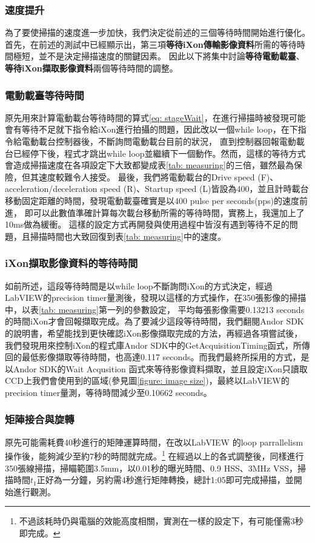\documentclass[12pt]{article}
\begin{document}
\subsubsection{速度提升}
為了要使掃描的速度進一步加快，我們決定從前述的三個等待時間開始進行優化。首先，在前述的測試中已經顯示出，第三項\textbf{等待iXon傳輸影像資料}所需的等待時間極短，並不是決定掃描速度的關鍵因素。
因此以下將集中討論\textbf{等待電動載臺}、\textbf{等待iXon擷取影像資料}兩個等待時間的調整。
\subsubsection{電動載臺等待時間}
原先用來計算電動載台等待時間的算式\ref{eq: stageWait}，在進行掃描時被發現可能會有等待不足就下指令給iXon進行拍攝的問題，因此改以一個while loop，在下指令給電動載台控制器後，不斷詢問電動載台目前的狀況，
直到控制器回報電動載台已經停下後，程式才跳出while loop並繼續下一個動作。然而，這樣的等待方式會造成掃描速度在各項設定下大致都變成表\ref{tab: measuring}的三倍，雖然最為保險，但其速度較難令人接受。
最後，我們將電動載台的Drive speed (F)、acceleration/deceleration speed (R)、Startup speed (L)皆設為400，並且計時載台移動固定距離的時間，發現電動載臺確實是以400 pulse per seconds(pps)的速度前進，
即可以此數值準確計算每次載台移動所需的等待時間，實務上，我還加上了10ms做為緩衝。
這樣的設定方式再開發與使用過程中皆沒有遇到等待不足的問題，且掃描時間也大致回復到表\ref{tab: measuring}中的速度。
\subsubsection{iXon擷取影像資料的等待時間}
如前所述，這段等待時間是以while loop不斷詢問iXon的方式決定，經過LabVIEW的precision timer量測後，發現以這樣的方式操作，在350張影像的掃描中，以表\ref{tab: measuring}第一列的參數設定，
平均每張影像需要0.13213 seconds的時間iXon才會回報擷取完成。為了要減少這段等待時間，我們翻閱Andor SDK的說明書，希望能找到更快確認iXon影像擷取完成的方法，再經過各項嘗試後，
我們發現用來控制iXon的程式庫Andor SDK中的GetAcquisitionTiming函式，所傳回的最低影像擷取等待時間，也高達0.117 seconds。而我們最終所採用的方式，是以Andor SDK的Wait Acqusition
函式來等待影像資料擷取，並且設定iXon只讀取CCD上我們會使用到的區域(參見圖\ref{figure: image size})，最終以LabVIEW的precision timer量測，等待時間減少至0.10662 seconds。

\subsubsection{矩陣接合與旋轉}
原先可能需耗費40秒進行的矩陣運算時間，在改以LabVIEW 的loop parrallelism操作後，能夠減少至約7秒的時間就完成。\footnote{不過該耗時仍與電腦的效能高度相關，實測在一樣的設定下，有可能僅需3秒即完成。}
在經過以上的各式調整後，同樣進行350張線掃描，掃瞄範圍3.5mm，以0.01秒的曝光時間、0.9 HSS、3MHz VSS，掃描時間$t_1$正好為一分鐘，另約需4秒進行矩陣轉換，總計1:05即可完成掃描，並開始進行觀測。
\end{document}

